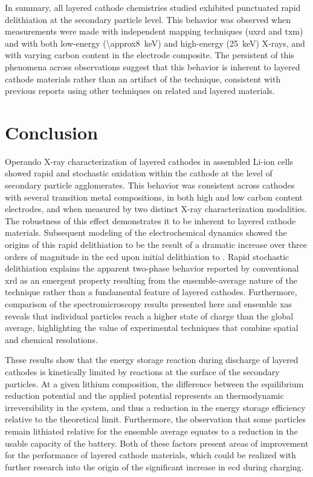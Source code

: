 \documentclass{article}
\begin{document}
In summary, all layered cathode chemistries studied exhibited
punctuated rapid delithiation at the secondary particle level. This
behavior was observed when measurements were made with independent
mapping techniques (\gls{uxrd} and \gls{txm}) and with both low-energy
(\SI{\approx8}{\kilo\electronvolt}) and high-energy
(\SI{25}{\kilo\electronvolt}) X-rays, and with varying carbon content
in the electrode composite. The persistent of this phenomena across
observations suggest that this behavior is inherent to layered cathode
materials rather than an artifact of the technique, consistent with
previous reports using other techniques on related \nmc{} and
 layered
materials\cite{chueh2021,rao2021,wang2020-6}.

\section{Conclusion}

Operando X-ray characterization of layered cathodes in assembled
Li-ion cells showed rapid and stochastic oxidation within the cathode
at the level of secondary particle agglomerates. This behavior was
consistent across cathodes with several transition metal compositions,
in both high and low carbon content electrodes, and when measured by
two distinct X-ray characterization modalities. The robustness of this
effect demonstrates it to be inherent to layered cathode
materials. Subsequent modeling of the electrochemical dynamics showed
the origins of this rapid delithiation to be the result of a dramatic
increase over three orders of magnitude in the \gls{ecd} upon initial
delithiation to . Rapid stochastic delithiation explains the
apparent two-phase behavior reported by conventional \gls{xrd} as an
emergent property resulting from the ensemble-average nature of the
technique rather than a fundamental feature of layered
cathodes. Furthermore, comparison of the spectromicroscopy results
presented here and ensemble \gls{xas} reveals that individual
particles reach a higher state of charge than the global average,
highlighting the value of experimental techniques that combine spatial
and chemical resolutions.

These results show that the energy storage reaction during discharge
of layered cathodes is kinetically limited by reactions at the surface
of the secondary particles. At a given lithium composition, the
difference between the equilibrium reduction potential and the applied
potential represents an thermodynamic irreversibility in the system,
and thus a reduction in the energy storage efficiency relative to the
theoretical limit. Furthermore, the observation that some particles
remain lithiated relative for the ensemble average equates to a
reduction in the usable capacity of the battery. Both of these factors
present areas of improvement for the performance of layered cathode
materials, which could be realized with further research into the
origin of the significant increase in \gls{ecd} during charging.
\end{document}
